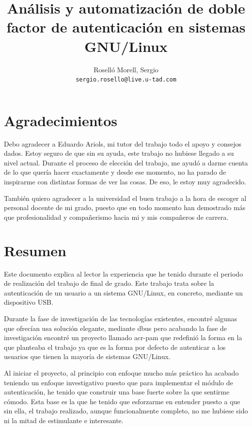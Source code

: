 \documentclass[titlepage, 12pt, a4paper]{article}
\title{Análisis y automatización de doble factor de autenticación en sistemas GNU/Linux}
\author{Roselló Morell, Sergio\\
\texttt{sergio.rosello@live.u-tad.com}}
\begin{document}
\maketitle
\section*{Agradecimientos}
Debo agradecer a Eduardo Ariols, mi tutor del trabajo todo el apoyo y consejos dados. Estoy seguro de que sin su ayuda, este trabajo no hubiese llegado a su nivel actual. Durante el proceso de elección del trabajo, me ayudó a darme cuenta de lo que quería hacer exactamente y desde ese momento, no ha parado de inspirarme con distintas formas de ver las cosas. De eso, le estoy muy agradecido.\par También quiero agradecer a la universidad el buen trabajo a la hora de escoger al personal docente de mi grado, puesto que en todo momento han demostrado más que profesionalidad y compañerismo hacia mi y mis compañeros de carrera.
\clearpage
\section*{Resumen}
Este documento explica al lector la experiencia que he tenido durante el periodo de realización del trabajo de final de grado. Este trabajo trata sobre la autenticación de un usuario a un sistema \gls{GNU/Linux}, en concreto, mediante un dispositivo \gls{USB}.\par 
Durante la fase de investigación de las tecnologías existentes, encontré algunas que ofrecían usa solución elegante, mediante \gls{dbus} pero acabando la fase de investigación encontré un proyecto llamado \gls{acr-pam} que redefinió la forma en la que planteaba el trabajo ya que es la forma por defecto de autenticar a los usuarios que tienen la mayoría de sistemas \gls{GNU/Linux}.\par 
Al iniciar el proyecto, al principio con enfoque mucho más práctico ha acabado teniendo un enfoque investigativo puesto que para implementar el módulo de autenticación, he tenido que construir una base fuerte sobre la que sentirme cómodo. Esta base es la que he tenido que esforzarme en entender puesto a que sin ella, el trabajo realizado, aunque funcionalmente completo, no me hubiese sido ni la mitad de estimulante e interesante.
\clearpage
\end{document}
